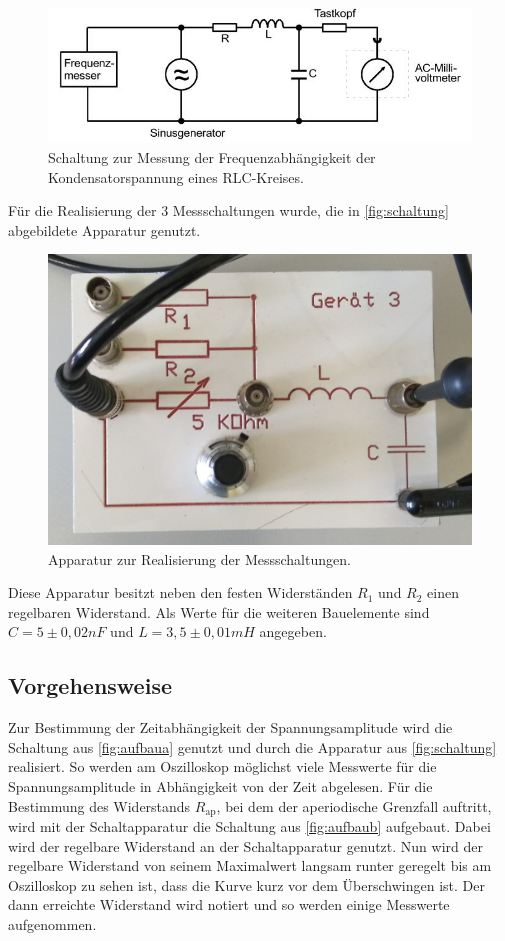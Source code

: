 \begin{figure}[H]
    \centering
    \includegraphics[width=\textwidth]{bilder/aufbauc.JPG}
    \caption{Schaltung zur Messung der Frequenzabhängigkeit der Kondensatorspannung eines RLC-Kreises. \cite{sample}}
    \label{fig:aufbauc}
  \end{figure}
\noindent
Für die Realisierung der 3 Messschaltungen wurde, die in \autoref{fig:schaltung} abgebildete Apparatur genutzt.
\begin{figure}[H]
    \centering
    \includegraphics[width=\textwidth]{bilder/schaltung.jpg}
    \caption{Apparatur zur Realisierung der Messschaltungen.}
    \label{fig:schaltung}
  \end{figure}
\noindent
Diese Apparatur besitzt neben den festen Widerständen $R_1$ und $R_2$ einen regelbaren Widerstand. Als Werte für die weiteren Bauelemente sind $C=5\pm0,02 nF$ und $L=3,5\pm0,01 mH$ angegeben.
\subsection{Vorgehensweise}
Zur Bestimmung der Zeitabhängigkeit der Spannungsamplitude wird die Schaltung aus \autoref{fig:aufbaua} genutzt und durch die Apparatur aus \autoref{fig:schaltung} realisiert. So werden am Oszilloskop möglichst viele Messwerte für die Spannungsamplitude in Abhängigkeit von der Zeit abgelesen. \newline
Für die Bestimmung des Widerstands $R_{\text{ap}}$, bei dem der aperiodische Grenzfall auftritt, wird mit der Schaltapparatur die Schaltung aus \autoref{fig:aufbaub} aufgebaut. Dabei wird der regelbare Widerstand an der Schaltapparatur genutzt. Nun wird der regelbare Widerstand von seinem Maximalwert langsam runter geregelt bis am Oszilloskop zu sehen ist, dass die Kurve kurz vor dem Überschwingen ist. Der dann erreichte Widerstand wird notiert und so werden einige Messwerte aufgenommen.\newline
